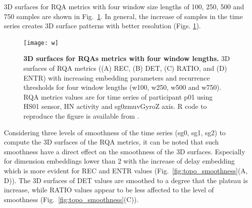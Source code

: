 
3D surfaces for RQA metrics with four window size lengths
of 100, 250, 500 and 750 samples are shown in Fig.~\ref{fig:topo_windows}.
In general, the increase of samples in the time series creates 3D surface 
patterns with better resolution (Figs. \ref{fig:topo_windows}).
\begin{figure}[!ht]
\centering
\texttt{[image: w]}
    \caption{
	{\bf 3D surfaces for RQAs metrics with four window lengths.}
	3D surfaces of RQA metrics ((A) REC, (B) DET, (C) RATIO, and (D) ENTR) 
	with increasing embedding 
	parameters and recurrence thresholds for four window 
	lengths (w100, w250, w500 and  w750).
	RQA metrics values are for time series of participant p01 
	using HS01 sensor, HN activity and sg0zmuvGyroZ axis.
	R code to reproduce the figure is available from \cite{hwum2018}.
        }
\label{fig:topo_windows}
\end{figure}

Considering three levels of smoothness of the time series (sg0, sg1, sg2) 
to compute the 3D surfaces of the RQA metrics, it can be noted that such 
smoothness have a direct effect on the smoothness of the 3D surfaces.
Especially for dimension embeddings lower than 2 with the increase of 
delay embedding which is more evident for REC and ENTR values 
(Fig.~\ref{fig:topo_smoothness}(A, D)).
The 3D surfaces of DET values are smoothed to a degree that the plateau 
is increase, while RATIO values appear to be less affected to the level 
of smoothness (Fig.~\ref{fig:topo_smoothness}(C)).

